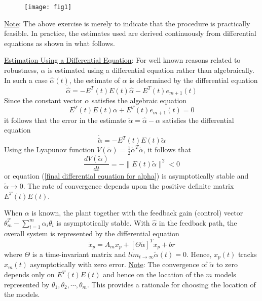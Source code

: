 \documentclass[conference]{IEEEtran}
\begin{document}
\begin{figure}[H]
\texttt{[image: fig1]}
\caption{}
\label{Fig1}
\end{figure}
{\large \underline{Note}}: The above exercise is merely to indicate that the procedure is practically feasible. In practice, the estimates used are derived continuously from differential equations as shown in what follows.




{\large \underline{Estimation Using a Differential Equation}}: For well known reasons related to robustness, $\alpha$ is estimated using a differential equation rather than algebraically. In such a case $\hat{\alpha}(t)$, the estimate of $\alpha$ is determined by the differential equation
\begin{equation}
\label{differential equation for alpha}
\dot{\hat{\alpha}}=-E^{T}(t)E(t)\hat{\alpha}-E^{T}(t)e_{m+1}(t)
\end{equation}
Since the constant vector $\alpha$ satisfies the algebraic equation
\begin{equation}
E^{T}(t)E(t)\alpha+E^{T}(t)e_{m+1}(t)=0
\end{equation}
it follows that the error in the estimate $\tilde{\alpha}=\hat{\alpha}-\alpha$ satisfies the differential equation
\begin{equation}
\label{final differential equation for alpha}
\dot{\tilde{\alpha}}=-E^{T}(t)E(t)\tilde{\alpha}
\end{equation}
Using the Lyapunov function $V(\tilde{\alpha})=\frac{1}{2}\tilde{\alpha}^{T}\tilde{\alpha}$, it follows that
\begin{equation}
\frac{dV(\tilde{\alpha})}{dt}=-\|E(t)\tilde{\alpha}\|^{2}< 0
\end{equation}
or equation (\ref{final differential equation for alpha}) is asymptotically stable and $\tilde{\alpha}\to 0$. The rate of convergence depends upon the positive definite matrix $E^{T}(t)E(t)$.

When $\alpha$ is known, the plant together with the feedback gain (control) vector $\theta_{m}^{T}-\sum_{i=1}^{m}\alpha_{i}\theta_{i}$ is asymptotically stable. With $\hat{\alpha}$ in the feedback path, the overall system is represented by the differential equation
\begin{equation}
\label{plant feedback control}
\dot{x}_{p}=A_{m}x_{p}+[\Theta\tilde{\alpha}]^{T}x_{p}+br
\end{equation}
where $\Theta$ is a time-invariant matrix and $lim_{t\to\infty}\tilde{\alpha}(t)=0$. Hence, $x_{p}(t)$ tracks $x_{m}(t)$ asymptotically with zero error.
{\large \underline{Note}}: The convergence of $\tilde{\alpha}$ to zero depends only on $E^{T}(t)E(t)$ and hence on the location of the $m$ models represented by $\theta_{1},\theta_{2},\cdots,\theta_{m}$. This provides a rationale for choosing the location of the models.
\end{document}
